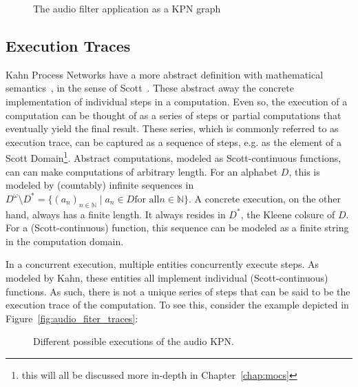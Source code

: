 \begin{figure}[h]
	\centering
\resizebox{0.9\textwidth}{!}{
\begin{tikzpicture}
   
 \end{tikzpicture}
}
   \caption{The audio filter application as a \ac{KPN} graph}
	\label{fig:audio_filter_graph}
\end{figure}

\subsection{Execution Traces}

Kahn Process Networks have a more abstract definition with mathematical semantics~\cite{kahn74}, in the sense of Scott~\cite{scott1970}.
These abstract away the concrete implementation of individual steps in a computation.
Even so, the execution of a computation can be thought of as a series of steps or partial computations that eventually yield the final result.
These series, which is commonly referred to as execution trace, can be captured as a sequence of steps, e.g. as the element of a Scott Domain\footnote{this will all be discussed more in-depth in Chapter~\ref{chap:mocs}}. 
Abstract computations, modeled as Scott-continuous functions, can can make computations of arbitrary length.
For an alphabet $D$, this is modeled by (countably) infinite sequences in $D^\omega \setminus D^* = \{ (a_n)_{n \in \mathbb{N}} \mid a_n \in D \text {for all} n \in \mathbb{N} \}$.
A concrete execution, on the other hand, always has a finite length.
It always resides in $D^*$, the Kleene colsure of $D$.
For a (Scott-continuous) function, this sequence can be modeled as a finite string in the computation domain.

In a concurrent execution, multiple entities concurrently execute steps.
As modeled by Kahn, these entities all implement individual (Scott-continuous) functions.
As such, there is not a unique series of steps that can be said to be the execution trace of the computation.
To see this, consider the example depicted in Figure~\ref{fig:audio_fiter_traces}:

\begin{figure}[h]
	\centering
   \resizebox{0.7\textwidth}{!}{}
   \caption{Different possible executions of the audio \ac{KPN}.}
	\label{fig:audio_filter_traces}
\end{figure}


